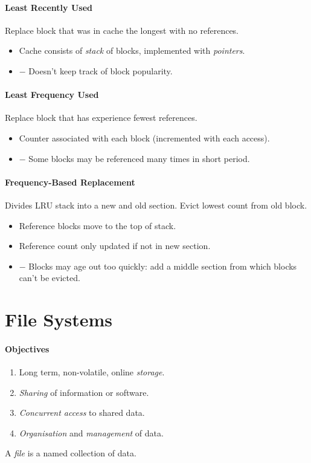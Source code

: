 \documentclass[twocolumn,english]{article}
\begin{document}
\paragraph{Least Recently Used}

Replace block that was in cache the longest with no references.
\begin{itemize}
\item Cache consists of \emph{stack} of blocks, implemented with \emph{pointers}.
\item $-$ Doesn't keep track of block popularity.
\end{itemize}

\paragraph{Least Frequency Used}

Replace block that has experience fewest references.
\begin{itemize}
\item Counter associated with each block (incremented with each access).
\item $-$ Some blocks may be referenced many times in short period.
\end{itemize}

\paragraph{Frequency-Based Replacement}

Divides LRU stack into a new and old section. Evict lowest count from
old block.
\begin{itemize}
\item Reference blocks move to the top of stack.
\item Reference count only updated if not in new section.
\item $-$ Blocks may age out too quickly: add a middle section from which
blocks can't be evicted.
\end{itemize}

\section{File Systems}

\paragraph{Objectives}
\begin{enumerate}
\item Long term, non-volatile, online \emph{storage}.
\item \emph{Sharing} of information or software.
\item \emph{Concurrent access} to shared data.
\item \emph{Organisation} and \emph{management} of data.
\end{enumerate}
A \emph{file} is a named collection of data.
\end{document}
